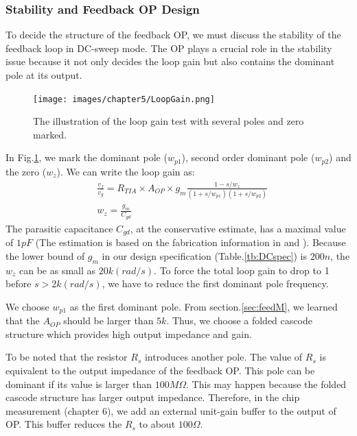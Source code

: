 {



\subsubsection{Stability and Feedback OP Design} \label{sec:stabilityandOP}
To decide the structure of the feedback OP, we must discuss the stability of the feedback loop in DC-sweep mode.
The OP plays a crucial role in the stability issue because it not only decides the loop gain but also contains the dominant pole at its output.

\begin{figure}[!htbp]
    \centering
        \texttt{[image: images/chapter5/LoopGain.png]}
    \caption{The illustration of the loop gain test with several poles and zero marked.}
    \label{fig:loopgain}
\end{figure}

In Fig.\ref{fig:loopgain}, we mark the dominant pole ($w_{p1}$), second order dominant pole ($w_{p2}$) and the zero ($w_z$).
We can write the loop gain as:
\begin{align}
    & \frac{v_f}{v_g} =  R_{TIA} \times A_{OP} \times g_m \frac{1 - s/w_z}{(1 + s/w_{p1})(1 + s/w_{p2})} \\
    & w_z = \frac{g_m}{C_{gd}}
\end{align}
The parasitic capacitance $C_{gd}$, at the conservative estimate, has a maximal value of $1pF$ (The estimation is based on the fabrication information in \cite{DN17} and \cite{C6}).
Because the lower bound of $g_m$ in our design specification (Table.\ref{tb:DCspec}) is $200n$, the $w_z$ can be as small as $20k (rad/s)$.
To force the total loop gain to drop to 1 before $s > 2k (rad/s)$, we have to reduce the first dominant pole frequency.

We choose $w_{p1}$ as the first dominant pole.
From section.\ref{sec:feedM}, we learned that the $A_{OP}$ should be larger than $5k$.
Thus, we choose a folded cascode structure which provides high output impedance and gain.

To be noted that the resistor $R_s$ introduces another pole.
The value of $R_s$ is equivalent to the output impedance of the feedback OP.
This pole can be dominant if its value is larger than $100M \Omega$.
This may happen because the folded cascode structure has larger output impedance.
Therefore, in the chip measurement (chapter 6), we add an external unit-gain buffer to the output of OP.
This buffer reduces the $R_s$ to about $100 \Omega$.

}
